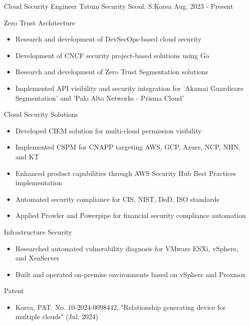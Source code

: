 
\begin{cventries}

\cventry
    {Cloud Security Engineer} %
    {Tatum Security} %
    {Seoul, S.Korea} %
    {Aug. 2023 - Present} %
    {
      \begin{cvitems}
        \item {Zero Trust Architecture}
        \begin{itemize}
          \item {Research and development of DevSecOps-based cloud security}
          \item {Development of CNCF security project-based solutions using Go}
          \item {Research and development of Zero Trust Segmentation solutions}
          \item {Implemented API visibility and security integration for 'Akamai Guardicore Segmentation' and 'Palo Alto Networks - Prisma Cloud'}
        \end{itemize}
        \item {Cloud Security Solutions}
        \begin{itemize}
          \item {Developed CIEM solution for multi-cloud permission visibility}
          \item {Implemented CSPM for CNAPP targeting AWS, GCP, Azure, NCP, NHN, and KT}
          \item {Enhanced product capabilities through AWS Security Hub Best Practices implementation}
          \item {Automated security compliance for CIS, NIST, DoD, ISO standards}
          \item {Applied Prowler and Powerpipe for financial security compliance automation}
        \end{itemize}
        \item {Infrastructure Security}
        \begin{itemize}
          \item {Researched automated vulnerability diagnosis for VMware ESXi, vSphere, and XenServer}
          \item {Built and operated on-premise environments based on vSphere and Proxmox}
        \end{itemize}
        \item {Patent}
        \begin{itemize}
          \item {Korea, PAT. No. 10-2024-0098442, "Relationship generating device for multiple clouds" (Jul. 2024)}
        \end{itemize}
      \end{cvitems}
    }


\end{cventries}
